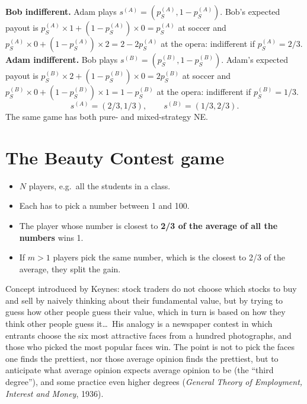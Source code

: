 \documentclass[11pt,a4paper,openany]{book}
\begin{document}
\begin{propbox}[title=Mixed-strategy NE of the Battle of the Sexes]
\textbf{Bob indifferent.} Adam plays $s^{(A)} = (p_S^{(A)}, 1 - p_S^{(A)})$. Bob's expected
payout is $p_S^{(A)} \times 1 + (1 - p_S^{(A)}) \times 0 = p_S^{(A)}$ at soccer and
$p_S^{(A)} \times 0 + (1 - p_S^{(A)}) \times 2 = 2 - 2p_S^{(A)}$ at the opera: indifferent
if $p_S^{(A)} = 2/3$. \\
\textbf{Adam indifferent.} Bob plays $s^{(B)} = (p_S^{(B)}, 1 - p_S^{(B)})$. Adam's expected
payout is $p_S^{(B)} \times 2 + (1 - p_S^{(B)}) \times 0 = 2p_S^{(B)}$ at soccer and
$p_S^{(B)} \times 0 + (1 - p_S^{(B)}) \times 1 = 1 - p_S^{(B)}$ at the opera: indifferent
if $p_S^{(B)} = 1/3$.
\[
s^{(A)} = (2/3, 1/3), \qquad s^{(B)} = (1/3, 2/3).
\]
The same game has both pure- and mixed-strategy NE.
\end{propbox}


\section{The Beauty Contest game}

\begin{defnbox}[title=Beauty Contest game]
\begin{itemize}
  \item $N$ players, e.g.\ all the students in a class.
  \item Each has to pick a number between 1 and 100.
  \item The player whose number is closest to \textbf{2/3 of the average of all the numbers}
        wins 1.
  \item If $m > 1$ players pick the same number, which is the closest to 2/3 of the average,
        they split the gain.
\end{itemize}
\end{defnbox}

\begin{rembox}[title=Keynes' beauty contest]
Concept introduced by Keynes: stock traders do not choose which stocks to buy and sell by
naively thinking about their fundamental value, but by trying to guess how other people guess
their value, which in turn is based on how they think other people guess it\dots\ His analogy
is a newspaper contest in which entrants choose the six most attractive faces from a hundred
photographs, and those who picked the most popular faces win. The point is not to pick the
faces one finds the prettiest, nor those average opinion finds the prettiest, but to
anticipate what average opinion expects average opinion to be (the ``third degree''), and
some practice even higher degrees (\emph{General Theory of Employment, Interest and Money},
1936).
\end{rembox}
\end{document}
